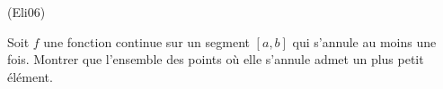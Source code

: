\begin{tiny}(Eli06)\end{tiny} Soit $f$ une fonction continue sur un segment $[a,b]$ qui s'annule au moins une fois. Montrer que l'ensemble des points où elle s'annule admet un plus petit élément.